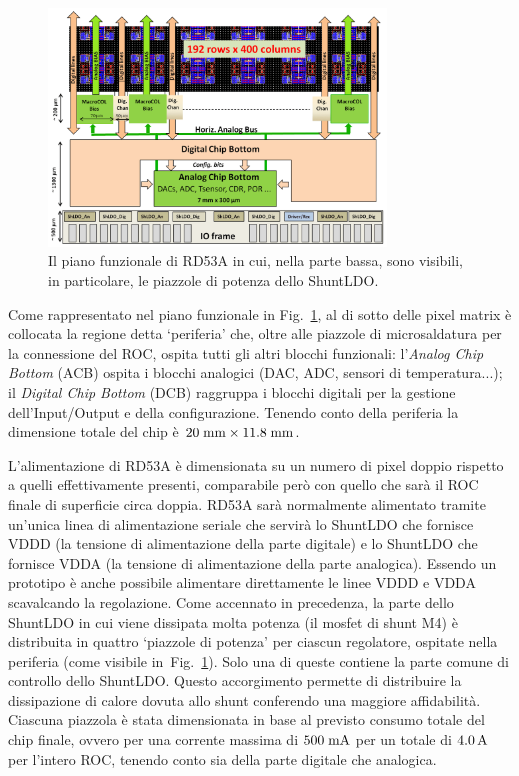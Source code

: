 \begin{figure}
\centering
\includegraphics[width=0.8\textwidth]{Immagini/RD53Apianofunzionale}
\caption{Il piano funzionale di RD53A in cui, nella parte bassa, sono visibili, in particolare, le piazzole di potenza dello ShuntLDO.}
\label{RD53AFunct}
\end{figure}
Come rappresentato nel piano funzionale in Fig.~\ref{RD53AFunct}, al di sotto delle pixel matrix \`e collocata la regione detta `periferia' che, oltre alle piazzole di microsaldatura per la connessione del ROC, ospita tutti gli altri blocchi funzionali: l'{\em Analog Chip Bottom} (ACB) ospita i blocchi analogici (DAC, ADC, sensori di temperatura...); il {\em Digital Chip Bottom} (DCB) raggruppa i blocchi digitali per la gestione dell'Input/Output e della configurazione. Tenendo conto della periferia la dimensione totale del chip \`e $20\rm \; mm \times 11.8\rm \; mm$.

L'alimentazione di RD53A \`e dimensionata su un numero di pixel doppio rispetto a quelli effettivamente presenti, comparabile per\`o con quello che sar\`a il ROC finale di superficie circa doppia. RD53A sar\`a normalmente alimentato tramite un'unica linea di alimentazione seriale che servirà lo ShuntLDO che fornisce VDDD (la tensione di alimentazione della parte digitale) e lo ShuntLDO che fornisce VDDA (la tensione di alimentazione della parte analogica). Essendo un prototipo \`e anche possibile alimentare direttamente le linee VDDD e VDDA scavalcando la regolazione.
Come accennato in precedenza, la parte dello ShuntLDO in cui viene dissipata molta potenza (il mosfet di shunt M4) \`e distribuita in quattro `piazzole di potenza' per ciascun regolatore, ospitate nella periferia (come visibile in~Fig.~\ref{RD53AFunct}). Solo una di queste contiene la parte comune di controllo dello ShuntLDO. Questo accorgimento permette di distribuire la dissipazione di calore dovuta allo shunt conferendo una maggiore affidabilità. Ciascuna piazzola \`e stata dimensionata in base al previsto consumo totale del chip finale, ovvero per una corrente massima di $500\rm \; mA$ per un totale di $4.0\rm \, A$ per l'intero ROC, tenendo conto sia della parte digitale che analogica.

